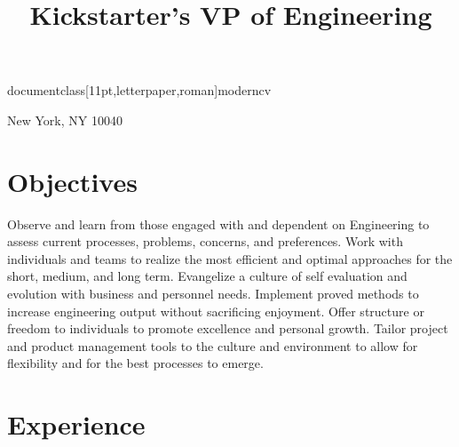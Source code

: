 documentclass[11pt,letterpaper,roman]{moderncv}
\usepackage[scale=0.75]{geometry}
\usepackage{footmisc}
\usepackage{graphicx}

\title{Kickstarter's VP of Engineering}
\address{28 Sickles Street A16}{New York, NY 10040}

\makecvtitle
\renewcommand{\thefootnote}{\fnsymbol{footnote}}


\section{Objectives}
Observe and learn from those engaged with and dependent on Engineering to assess current processes, problems, concerns, and preferences.  Work with individuals and teams to realize the most efficient and optimal approaches for the short, medium, and long term.  Evangelize a culture of self evaluation and evolution with business and personnel needs.  Implement proved methods to increase engineering output without sacrificing enjoyment.  Offer structure or freedom to individuals to promote excellence and personal growth.  Tailor project and product management tools to the culture and environment to allow for flexibility and for the best processes to emerge.


\section{Experience}



